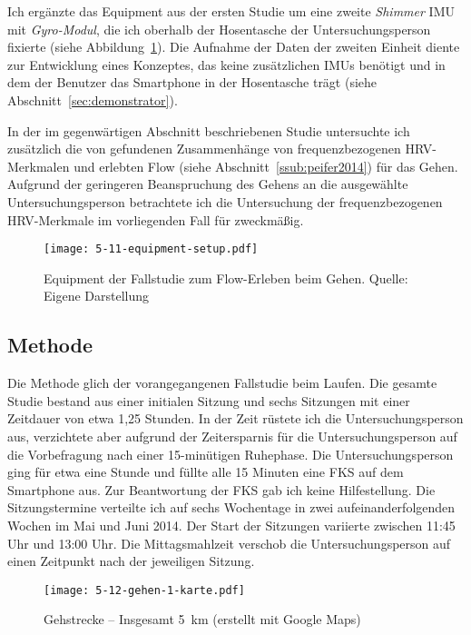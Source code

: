 Ich ergänzte das Equipment aus der ersten Studie um eine zweite \emph{Shimmer} \ac{IMU} mit \emph{Gyro-Modul}, die ich oberhalb der Hosentasche der Untersuchungsperson fixierte (siehe Abbildung~\ref{fig:5_11_equipment_setup}). Die Aufnahme der Daten der zweiten Einheit diente zur Entwicklung eines Konzeptes, das keine zusätzlichen \acp{IMU} benötigt und in dem der Benutzer das Smartphone in der Hosentasche trägt (siehe Abschnitt~\ref{sec:demonstrator}).

In der im gegenwärtigen Abschnitt beschriebenen Studie untersuchte ich zusätzlich die von \citet{Peifer2014} gefundenen Zusammenhänge von frequenzbezogenen \ac{HRV}-Merkmalen und erlebten Flow (siehe Abschnitt~\ref{ssub:peifer2014}) für das Gehen. Aufgrund der geringeren Beanspruchung des Gehens an die ausgewählte Untersuchungsperson betrachtete ich die Untersuchung der frequenzbezogenen \ac{HRV}-Merkmale im vorliegenden Fall für zweckmäßig.

\begin{figure}[t]
	\centering
		\texttt{[image: 5-11-equipment-setup.pdf]}
	\caption[Equipment der Fallstudie zum Flow-Erleben beim Gehen]{Equipment der Fallstudie zum Flow-Erleben beim Gehen. Quelle: Eigene Darstellung}
	\label{fig:5_11_equipment_setup}
\end{figure}

\subsection{Methode}
Die Methode glich der vorangegangenen Fallstudie beim Laufen. Die gesamte Studie bestand aus einer initialen Sitzung und sechs Sitzungen mit einer Zeitdauer von etwa 1,25 Stunden. In der Zeit rüstete ich die Untersuchungsperson aus, verzichtete aber aufgrund der Zeitersparnis für die Untersuchungsperson auf die Vorbefragung nach einer 15-minütigen Ruhephase. Die Untersuchungsperson ging für etwa eine Stunde und füllte alle 15 Minuten eine \ac{FKS} auf dem Smartphone aus. Zur Beantwortung der \ac{FKS} gab ich keine Hilfestellung. Die Sitzungstermine verteilte ich auf sechs Wochentage in zwei aufeinanderfolgenden Wochen im Mai und Juni 2014. Der Start der Sitzungen variierte zwischen 11:45 Uhr und 13:00 Uhr. Die Mittagsmahlzeit verschob die Untersuchungsperson auf einen Zeitpunkt nach der jeweiligen Sitzung.

\begin{figure}[t]
	\centering
		\texttt{[image: 5-12-gehen-1-karte.pdf]}
	\caption[Gehstrecke]{Gehstrecke -- Insgesamt 5~km (erstellt mit Google Maps)}
	\label{fig:5_12_gehen_1_karte}
\end{figure}

